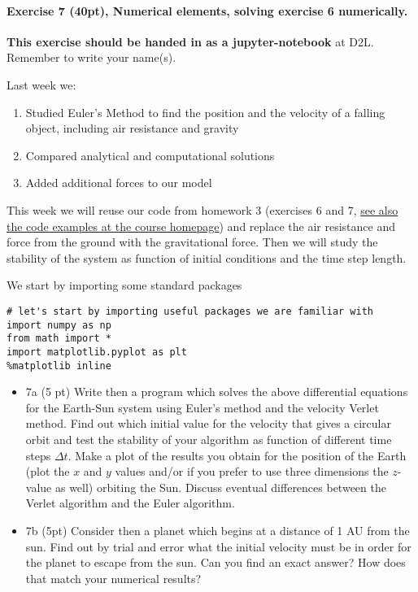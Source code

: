 \documentclass[%
oneside,                 %
final,                   %
10pt]{article}
\begin{document}
\noindent
\paragraph{Exercise 7 (40pt), Numerical elements, solving exercise 6 numerically.}
\textbf{This exercise should be handed in as a jupyter-notebook} at D2L. Remember to write your name(s). 

Last week we:
\begin{enumerate}
\item Studied  Euler's Method to find the position and the velocity of a falling object, including air resistance and gravity

\item Compared analytical and computational solutions 

\item Added additional forces to our model
\end{enumerate}

\noindent
This week we will reuse our code from homework 3 (exercises 6 and 7,
\href{{https://github.com/mhjensen/Physics321/tree/master/doc/src/motion/Programs}}{see also the code examples at the course
homepage})
and replace the air resistance and force from the ground with the
gravitational force. Then we will study the stability of the system as function of initial conditions and the time step length.

We start by importing some standard packages
\begin{verbatim}
# let's start by importing useful packages we are familiar with
import numpy as np
from math import *
import matplotlib.pyplot as plt
%matplotlib inline
\end{verbatim}

\begin{itemize}
\item 7a (5 pt)  Write then a program which solves the above differential equations for the Earth-Sun system using Euler's  method and the velocity Verlet method.  Find out which initial value for the velocity that gives a circular orbit and test the stability of your algorithm as function of different time steps $\Delta t$.  Make a plot of the results you obtain for the position of the Earth (plot the $x$ and $y$ values and/or if you prefer to use three dimensions the $z$-value as well) orbiting  the Sun. Discuss eventual differences between the Verlet algorithm and the Euler algorithm. 

\item 7b (5pt) Consider then a planet which begins at a distance of 1 AU from the sun. Find out by trial and error what the initial velocity must be in order for the planet to escape from the sun.  Can you find an exact answer?  How does that match your numerical results?
\end{itemize}
\end{document}
